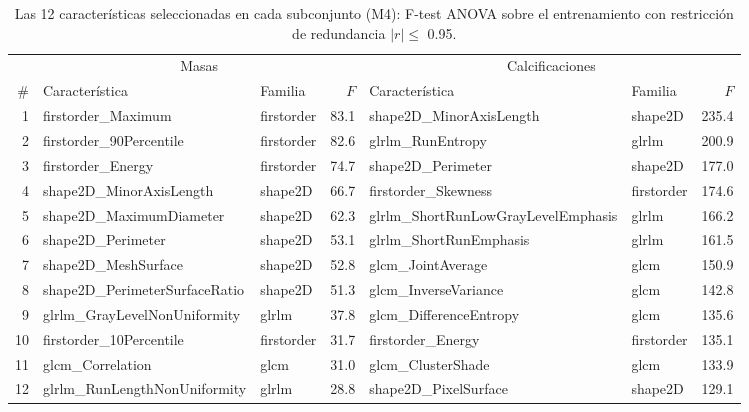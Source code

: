 \begin{table}[H]
\centering
\small
\caption{Las 12 características seleccionadas en cada subconjunto (M4): F-test ANOVA sobre el entrenamiento con restricción de redundancia $|r| \le$ 0.95.}
\label{tab:m4_seleccion}
\begin{adjustbox}{max width=\linewidth}
\begin{tabular}{r l l r l l r}
\toprule
 & \multicolumn{3}{c}{Masas} & \multicolumn{3}{c}{Calcificaciones} \\ \cmidrule(lr){2-4}\cmidrule(lr){5-7}
\# & Característica & Familia & $F$ & Característica & Familia & $F$ \\
\midrule
1 & firstorder\_Maximum & firstorder & 83.1 & shape2D\_MinorAxisLength & shape2D & 235.4 \\
2 & firstorder\_90Percentile & firstorder & 82.6 & glrlm\_RunEntropy & glrlm & 200.9 \\
3 & firstorder\_Energy & firstorder & 74.7 & shape2D\_Perimeter & shape2D & 177.0 \\
4 & shape2D\_MinorAxisLength & shape2D & 66.7 & firstorder\_Skewness & firstorder & 174.6 \\
5 & shape2D\_MaximumDiameter & shape2D & 62.3 & glrlm\_ShortRunLowGrayLevelEmphasis & glrlm & 166.2 \\
6 & shape2D\_Perimeter & shape2D & 53.1 & glrlm\_ShortRunEmphasis & glrlm & 161.5 \\
7 & shape2D\_MeshSurface & shape2D & 52.8 & glcm\_JointAverage & glcm & 150.9 \\
8 & shape2D\_PerimeterSurfaceRatio & shape2D & 51.3 & glcm\_InverseVariance & glcm & 142.8 \\
9 & glrlm\_GrayLevelNonUniformity & glrlm & 37.8 & glcm\_DifferenceEntropy & glcm & 135.6 \\
10 & firstorder\_10Percentile & firstorder & 31.7 & firstorder\_Energy & firstorder & 135.1 \\
11 & glcm\_Correlation & glcm & 31.0 & glcm\_ClusterShade & glcm & 133.9 \\
12 & glrlm\_RunLengthNonUniformity & glrlm & 28.8 & shape2D\_PixelSurface & shape2D & 129.1 \\
\bottomrule
\end{tabular}
\end{adjustbox}
\end{table}
